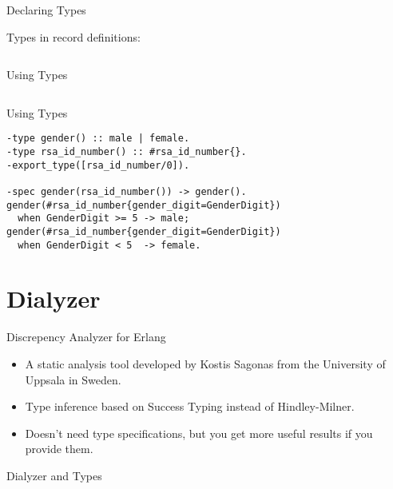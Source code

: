 \documentclass{beamer}
\begin{document}
\begin{frame}{Declaring Types}

Types in record definitions:

  \inputminted[firstline=10]{erlang}{src/rsa_id_number.hrl}

\end{frame}


\begin{frame}{Using Types}

  \inputminted[firstline=8, lastline=9]{erlang}{src/cards.erl}

\end{frame}


\begin{frame}[fragile]{Using Types}

  \begin{verbatim}
-type gender() :: male | female.
-type rsa_id_number() :: #rsa_id_number{}.
-export_type([rsa_id_number/0]).

-spec gender(rsa_id_number()) -> gender().
gender(#rsa_id_number{gender_digit=GenderDigit})
  when GenderDigit >= 5 -> male;
gender(#rsa_id_number{gender_digit=GenderDigit})
  when GenderDigit < 5  -> female.
  \end{verbatim}

\end{frame}


\section{Dialyzer}


\begin{frame}{Discrepency Analyzer for Erlang}

  \begin{itemize}[<+->]
  \item A static analysis tool developed by Kostis Sagonas from the
    University of Uppsala in Sweden.
  \item Type inference based on Success Typing instead of
    Hindley-Milner.
  \item Doesn't need type specifications, but you get more useful
    results if you provide them.
  \end{itemize}

\end{frame}


\begin{frame}{Dialyzer and Types}

  \inputminted[firstline=4, lastline=6]{erlang}{src/cards.erl}

\end{frame}
\end{document}
